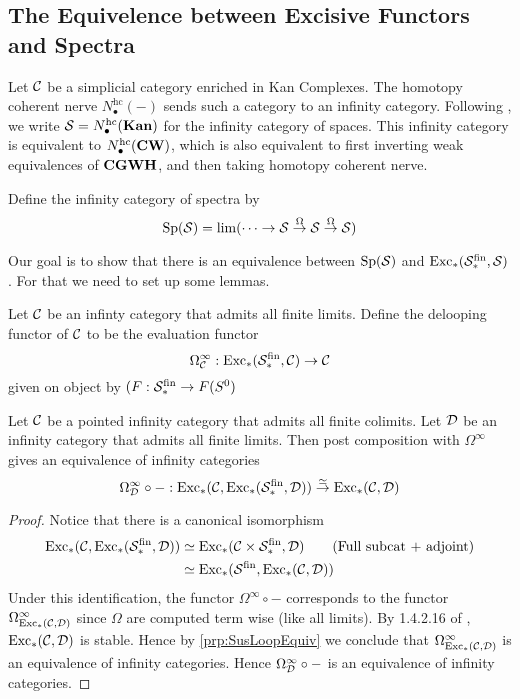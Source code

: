 \subsection{The Equivelence between Excisive Functors and Spectra}
Let $\mathcal{C}$ be a simplicial category enriched in Kan Complexes. The homotopy coherent nerve $N_\bullet^\text{hc}(-)$ sends such a category to an infinity category. Following \cite{Kerodon}, we write $\mathcal{S}=N_\bullet^{\text{hc}}(\bold{Kan})$ for the infinity category of spaces. This infinity category is equivalent to $N_\bullet^\text{hc}(\bold{CW})$, which is also equivalent to first inverting weak equivalences of $\bold{CGWH}$, and then taking homotopy coherent nerve. 

\begin{defn}\label{defn:ICSpec} Define the infinity category of spectra by $$\text{Sp}(\mathcal{S})=\lim(\cdots\rightarrow\mathcal{S}\overset{\Omega}{\rightarrow}\mathcal{S}\overset{\Omega}{\rightarrow}\mathcal{S})$$
\end{defn}

Our goal is to show that there is an equivalence between $\text{Sp}(\mathcal{S})$ and $\text{Exc}_\ast(\mathcal{S}_\ast^\text{fin},\mathcal{S})$. For that we need to set up some lemmas. 

\begin{defn}\label{defn:Delooping} Let $\mathcal{C}$ be an infinty category that admits all finite limits. Define the delooping functor of $\mathcal{C}$ to be the evaluation functor $$\Omega_{\mathcal{C}}^\infty:\text{Exc}_\ast(\mathcal{S}_\ast^\text{fin},\mathcal{C})\to\mathcal{C}$$ given on object by $(F:\mathcal{S}_\ast^\text{fin}\to F(S^0)$
\end{defn}

\begin{prp}\label{prp:DeloopEquiv} Let $\mathcal{C}$ be a pointed infinity category that admits all finite colimits. Let $\mathcal{D}$ be an infinity category that admits all finite limits. Then post composition with $\Omega^\infty$ gives an equivalence of infinity categories $$\Omega_{\mathcal{D}}^\infty\circ-:\text{Exc}_\ast(\mathcal{C},\text{Exc}_\ast(\mathcal{S}_\ast^\text{fin},\mathcal{D}))\overset{\simeq}{\rightarrow}\text{Exc}_\ast(\mathcal{C},\mathcal{D})$$ 
\begin{proof}
Notice that there is a canonical isomorphism 
\begin{align*}
\text{Exc}_\ast(\mathcal{C},\text{Exc}_\ast(\mathcal{S}_\ast^\text{fin},\mathcal{D}))&\simeq\text{Exc}_\ast(\mathcal{C}\times\mathcal{S}_\ast^\text{fin},\mathcal{D})\tag{Full subcat + adjoint}\\
&\simeq\text{Exc}_\ast(\mathcal{S}^\text{fin},\text{Exc}_\ast(\mathcal{C},\mathcal{D}))
\end{align*}
Under this identification, the functor $\Omega^\infty\circ -$ corresponds to the functor $\Omega_{\text{Exc}_\ast(\mathcal{C},\mathcal{D})}^\infty$ since $\Omega$ are computed term wise (like all limits). By 1.4.2.16 of \cite{HA}, $\text{Exc}_\ast(\mathcal{C},\mathcal{D})$ is stable. Hence by \ref{prp:SusLoopEquiv} we conclude that $\Omega_{\text{Exc}_\ast(\mathcal{C},\mathcal{D})}^\infty$ is an equivalence of infinity categories. Hence $\Omega_{\mathcal{D}}^\infty\circ-$ is an equivalence of infinity categories. 
\end{proof}
\end{prp}

